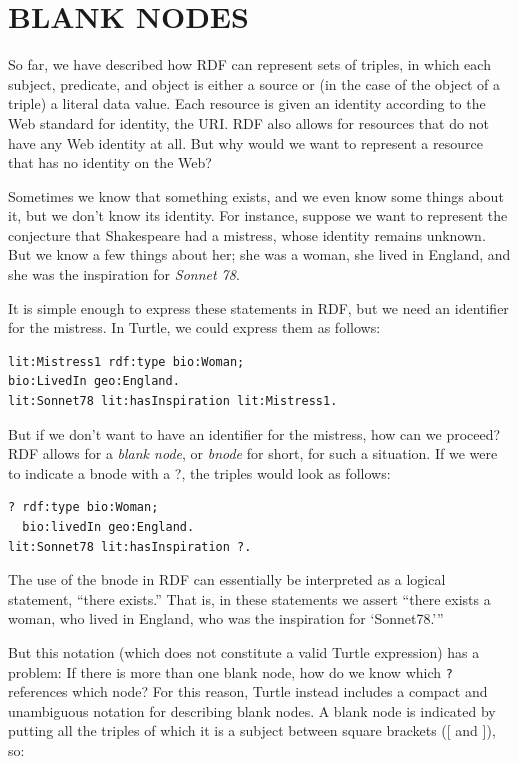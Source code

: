 \section{BLANK NODES\label{blanknodes}}

So far, we have described how RDF can represent sets of triples, in
which each subject, predicate, and object is either a source or (in the
case of the object of a triple) a literal data value. Each resource is
given an identity according to the Web standard for identity, the URI.
RDF also allows for resources that do not have any Web identity at all.
But why would we want to represent a resource that has no identity on
the Web?

Sometimes we know that something exists, and we even know some things
about it, but we don't know its identity. For instance, suppose we want
to represent the conjecture that Shakespeare had a mistress, whose identity
remains unknown. But we know a few things about her; she was a woman,
she lived in England, and she was the inspiration for \emph{Sonnet 78}.

It is simple enough to express these statements in RDF, but we need an
identifier for the mistress. In
Turtle, we could express them as follows:

\begin{lstlisting}
lit:Mistress1 rdf:type bio:Woman;
bio:LivedIn geo:England.
lit:Sonnet78 lit:hasInspiration lit:Mistress1.
\end{lstlisting}

But if we don't want to have an identifier for the mistress, how can we
proceed? RDF allows for a \emph{blank node}, or \emph{bnode} for short, for such a
situation. If we were to indicate a bnode with a ?, the triples would
look as follows:

\begin{lstlisting}
? rdf:type bio:Woman;
  bio:livedIn geo:England. 
lit:Sonnet78 lit:hasInspiration ?.
\end{lstlisting}

The use of the bnode in RDF can essentially be interpreted as a logical
statement, ``there exists.'' That is, in these statements we assert
``there exists a woman, who lived in England, who was the inspiration
for `Sonnet78.'''

But this notation (which does not constitute a valid Turtle expression)
has a problem: If there is
more than one blank node, how do we know which \texttt{?} references which
node? For this reason, Turtle instead includes a compact and unambiguous
notation for describing blank nodes. A blank node is indicated by
putting all the triples of which it is a subject between square brackets
({[} and {]}), so:

